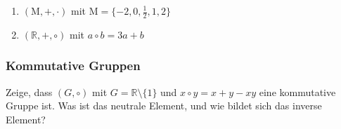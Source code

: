 \documentclass[11pt, a4paper]{article}
\newcommand\braces[1]{\left(#1\right)}
\newif\ifshowsolution
\begin{document}
\begin{enumerate}
	\item $\braces{\mathrm{M}, +, \cdot}$ mit $\mathrm{M} = \{ -2,0,\frac{1
	}{2},1,2 \}$
	
	\ifshowsolution
		Verletzung der Abgeschlossenheit: $1+2 \notin \mathrm{M}$, somit gilt nicht: $\mathrm{M} \times \mathrm{M} \mapsto \mathrm{M}$ \\
		Kein additives Inverses zu 1: $\nexists x \in \mathrm{M}: 1+x=0$ \\
		Kein multiplikatives Inverses zu -2: $\nexists x \in \mathrm{M}: -2 \cdot x = 1$ \\
		$\braces{\mathrm{M}, +, \cdot}$ mit $\mathrm{M} = \{ -2,0,\frac{1
	}{2},1,2 \}$ ist somit nichts von alledem.
	\fi
	
	\item $\braces{\mathbb{R}, +, \circ}$ mit $a \circ b = 3a + b$
	
	\ifshowsolution
		$\circ$ ist nicht assoziativ:
		\begin{align*}
			(a \circ b) \circ c &= a \circ (b \circ c) \\
			(3a + b) \circ c &= a \circ (3b + c) \\
			3(3a + b) + c &= 3a + (3b + c) \\
			9a &\neq 3a
		\end{align*}
		
		Somit ist $\braces{\mathbb{R}, +, \circ}$ mit $a \circ b = 3a + b$ nichts von alledem.
	\fi
\end{enumerate}

\subsubsection{Kommutative Gruppen}
Zeige, dass $(G,\circ)$ mit $G=\mathbb{R} \setminus \{1\}$ und $x \circ y = x+y-xy$ eine kommutative Gruppe ist. Was ist das neutrale Element, und wie bildet sich das inverse Element?
\end{document}
